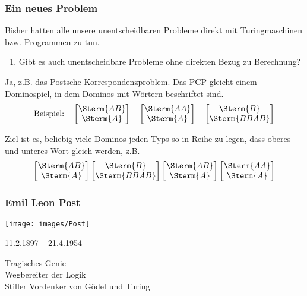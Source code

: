 \documentclass[aspectratio=1610,onlymath]{beamer}
\begin{document}
\begin{frame}\frametitle{Ein neues Problem}

Bisher hatten alle unsere unentscheidbaren Probleme direkt mit
Turingmaschinen bzw. Programmen zu tun.\\
\begin{enumerate}[$\leadsto$]
\item Gibt es auch unentscheidbare Probleme ohne direkten Bezug zu Berechnung?
\end{enumerate}
\bigskip\pause

Ja, z.B. das \alert{Postsche Korrespondenzproblem}. Das PCP gleicht einem Dominospiel, in dem Dominos mit Wörtern beschriftet sind.
\[
\text{Beispiel:}\quad
\left[\begin{matrix}\Sterm{AB}\\\Sterm{A}\end{matrix}\right]\quad
\left[\begin{matrix}\Sterm{AA}\\\Sterm{A}\end{matrix}\right]\quad
\left[\begin{matrix}\Sterm{B}\\\Sterm{BBAB}\end{matrix}\right]
 \]

Ziel ist es, beliebig viele Dominos jeden Typs so in Reihe zu legen, dass oberes und unteres Wort gleich werden\pause, z.B.
\[
\left[\begin{matrix}\Sterm{AB}\\\Sterm{A}\end{matrix}\right]
\left[\begin{matrix}\Sterm{B}\\\Sterm{BBAB}\end{matrix}\right]
\left[\begin{matrix}\Sterm{AB}\\\Sterm{A}\end{matrix}\right]
\left[\begin{matrix}\Sterm{AA}\\\Sterm{A}\end{matrix}\right]
 \]


\end{frame}

\begin{frame}\label{frame_post}\frametitle{Emil Leon Post}

\begin{center}

\texttt{[image: images/Post]}

11.2.1897 -- 21.4.1954
\bigskip

Tragisches Genie\\
Wegbereiter der Logik\\
Stiller Vordenker von Gödel und Turing

\end{center}

\end{frame}
\end{document}

